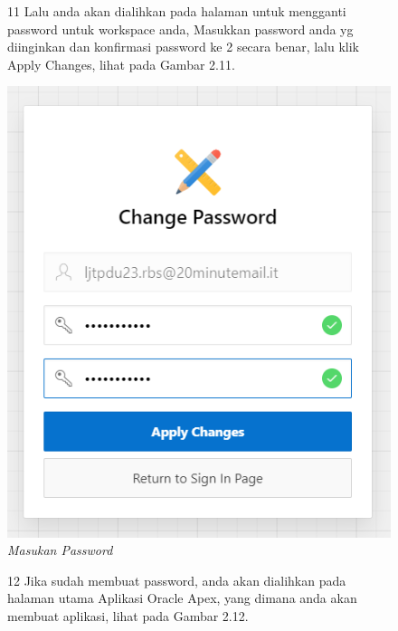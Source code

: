 \begin{itemize}
        \begin{figure}[!htbp]
        \item[11]Lalu anda akan dialihkan pada halaman untuk mengganti password untuk workspace anda, Masukkan password anda yg diinginkan dan konfirmasi password ke 2 secara benar, lalu klik Apply Changes, lihat pada Gambar 2.11.
        \begin{center}
        \includegraphics[scale=0.5]{figures/11.png}
        \caption{\textit{Masukan Password}}
        \end{center}
        \end{figure}
        
        \begin{figure}[!htbp]
        \item[12]Jika sudah membuat password, anda akan dialihkan pada halaman utama Aplikasi Oracle Apex, yang dimana anda akan membuat aplikasi, lihat pada Gambar 2.12.
        

\end{figure}
\end{itemize}
